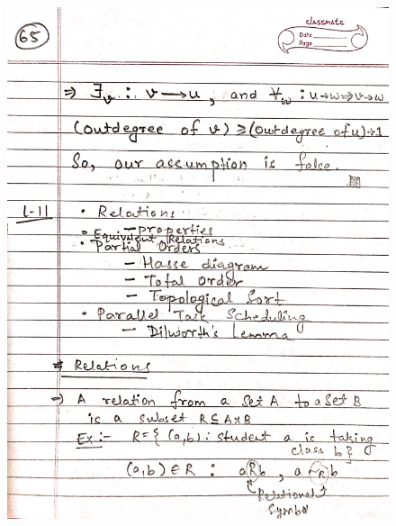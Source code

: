 \begin{figure}[H]
    \centering
    \includegraphics[scale=0.25]{"./MIT-6.042J/MIT-6042J-065"}
\end{figure}
\newpage
